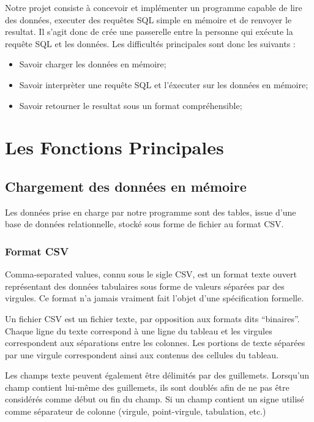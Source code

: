 \documentclass[oneside,13pt,a4paper]{report}
\begin{document}
Notre projet consiste à concevoir et implémenter un programme capable de lire des données, executer des requêtes SQL simple en mémoire et de renvoyer le resultat.
Il s’agit donc de crée une passerelle entre la personne qui exécute la requête SQL et les données.
Les difficultés principales sont donc les suivants :
\vspace{0.3cm}
\begin{itemize}
	\item Savoir charger les données en mémoire;
	\item Savoir interprèter une requête SQL et l'éxecuter sur les données en mémoire;
	\item Savoir retourner le resultat sous un format compréhensible;
\end{itemize}
\vspace{0.3cm}


\section{Les Fonctions Principales}

\subsection{Chargement des données en mémoire}

Les données prise en charge par notre programme sont des tables, issue d'une base de données relationnelle, stocké sous forme de fichier au format CSV.

\subsubsection{Format CSV}

Comma-separated values, connu sous le sigle CSV, est un format texte ouvert représentant des données tabulaires sous forme de valeurs séparées par des virgules. 
Ce format n'a jamais vraiment fait l'objet d'une spécification formelle.

Un fichier CSV est un fichier texte, par opposition aux formats dits \enquote{binaires}.
Chaque ligne du texte correspond à une ligne du tableau et les virgules correspondent aux séparations entre les colonnes. 
Les portions de texte séparées par une virgule correspondent ainsi aux contenus des cellules du tableau.

Les champs texte peuvent également être délimités par des guillemets. Lorsqu'un champ contient lui-même des guillemets, ils sont doublés afin de ne pas être considérés comme début ou fin du champ. 
Si un champ contient un signe utilisé comme séparateur de colonne (virgule, point-virgule, tabulation, etc.)
\end{document}
